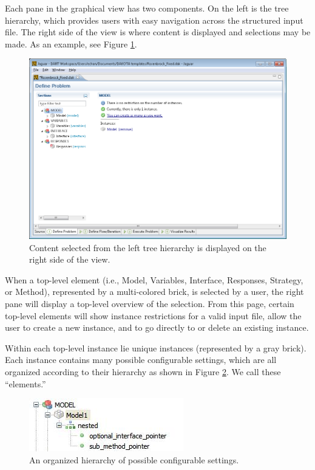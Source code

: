Each pane in the graphical view has two components.  On the left is
the tree hierarchy, which provides users with easy navigation across
the structured input file.  The right side of the view is where
content is displayed and selections may be made.  As an example, see
Figure \ref{fig:input:jag_graphical2}.
\begin{figure}
  \centering
  \includegraphics[scale=0.4]{images/2_1jag_graphical2}
  \caption{Content selected from the left tree hierarchy is displayed
    on the right side of the view.}
  \label{fig:input:jag_graphical2}
\end{figure}

When a top-level element (i.e., Model, Variables, Interface,
Responses, Strategy, or Method), represented by a multi-colored brick,
is selected by a user, the right pane will display a top-level
overview of the selection.  From this page, certain top-level elements
will show instance restrictions for a valid input file, allow the user
to create a new instance, and to go directly to or delete an existing
instance.

Within each top-level instance lie unique instances (represented by a
gray brick).  Each instance contains many possible configurable
settings, which are all organized according to their hierarchy as
shown in Figure \ref{fig:input:jag_graphical3}.  We call these
``elements.''
\begin{figure}
  \centering
  \includegraphics[scale=0.8]{images/jag_graphical3}
  \caption{An organized hierarchy of possible configurable settings.}
  \label{fig:input:jag_graphical3}
\end{figure}

